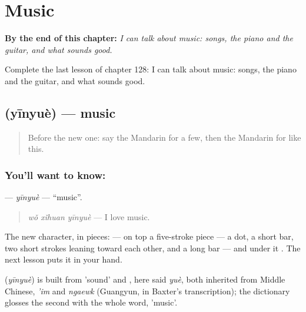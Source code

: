 
\chapter{Music}
\label{ch:zh-music}

\begin{chapteropening}
\textbf{By the end of this chapter:} \emph{I can talk about music: songs, the piano and the guitar, and what sounds good.}

Complete the last lesson of chapter 128: I can talk about music: songs, the piano and the guitar, and what sounds good.
\end{chapteropening}

\section[\texorpdfstring{\zh{音乐} (yīnyuè)}{音乐 (yīnyuè)}]{ (yīnyuè) — music}

\label{lesson:ZH-C128-yinyue}



\begin{quote}
Before the new one: say the Mandarin for a few, then the Mandarin for like this.
\end{quote}

\subsection*{You'll want to know: }
\textbf{} — \emph{yīnyuè} — \textquotedblleft{}music\textquotedblright{}.

\begin{quote}
\textbf{} \emph{wǒ xǐhuan yīnyuè} — I love music.
\end{quote}

The new character, in pieces:  — on top a five-stroke piece — a dot, a short bar, two short strokes leaning toward each other, and a long bar — and under it . The next lesson puts it in your hand.

\begin{cousinweb}
\textbf{} (\emph{yīnyuè}) is built from  'sound' and , here said \emph{yuè}, both inherited from Middle Chinese, \emph{'im} and \emph{ngaewk} (Guangyun, in Baxter's transcription); the dictionary glosses the second with the whole word, 'music'.
\end{cousinweb}

